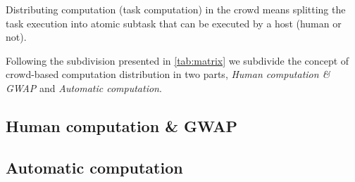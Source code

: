




Distributing computation (task computation) in the crowd means splitting
the task execution into atomic subtask that can be executed by a host (human or
not).


Following the subdivision presented in \autoref{tab:matrix} we subdivide the
concept of crowd-based computation distribution in two parts, \emph{Human
computation \& \ac{GWAP}} and \emph{Automatic computation}.

\subsection{Human computation \& \acs{GWAP}}
\label{sec:bg:crowd:human}


\subsection{Automatic computation}
\label{sec:bg:crowd:auto}
